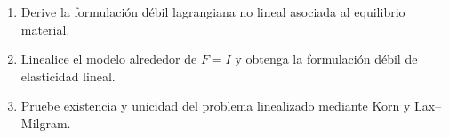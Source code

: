 \documentclass[11pt]{article}
\begin{document}
\begin{enumerate}[label=\textbf{\arabic*.}, leftmargin=*]
\begin{enumerate}[label=(\alph*), leftmargin=*]
    \item Derive la formulaci\'on d\'ebil lagrangiana no lineal asociada al equilibrio material.

    \item Linealice el modelo alrededor de $F=I$ y obtenga la formulaci\'on d\'ebil de elasticidad lineal.

    \item Pruebe existencia y unicidad del problema linealizado mediante Korn y Lax--Milgram.
\end{enumerate}

\end{enumerate}
\end{document}
